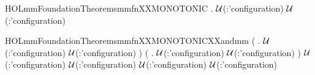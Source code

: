 \newcommand{\HOLmmFoundationTheoremsmmfnXXCLAUSES}{\UseVerbatim{HOLmmFoundationTheoremsmmfnXXCLAUSES}}
\begin{SaveVerbatim}{HOLmmFoundationTheoremsmmfnXXMONOTONIC}
\HOLTokenTurnstile{} \HOLSymConst{\HOLTokenForall{}}  .
        \HOLSymConst{\HOLTokenImp{}}
        \ensuremath{\cal{U}}(:'configuration)  \HOLConst{\HOLTokenSubset{}}
        \ensuremath{\cal{U}}(:'configuration) 
\end{SaveVerbatim}
\newcommand{\HOLmmFoundationTheoremsmmfnXXMONOTONIC}{\UseVerbatim{HOLmmFoundationTheoremsmmfnXXMONOTONIC}}
\begin{SaveVerbatim}{HOLmmFoundationTheoremsmmfnXXMONOTONICXXandmm}
\HOLTokenTurnstile{} (\HOLSymConst{\HOLTokenForall{}} .
         \HOLSymConst{\HOLTokenImp{}}
         \ensuremath{\cal{U}}(:'configuration)  \HOLConst{\HOLTokenSubset{}}
         \ensuremath{\cal{U}}(:'configuration) ) \HOLSymConst{\HOLTokenImp{}}
   (\HOLSymConst{\HOLTokenForall{}} .
         \HOLSymConst{\HOLTokenImp{}}
         \ensuremath{\cal{U}}(:'configuration)  \HOLConst{\HOLTokenSubset{}}
         \ensuremath{\cal{U}}(:'configuration) ) \HOLSymConst{\HOLTokenImp{}}
      \HOLSymConst{\HOLTokenImp{}}
      \ensuremath{\cal{U}}(:'configuration)  \HOLConst{\HOLTokenInter{}}
      \ensuremath{\cal{U}}(:'configuration)  \HOLConst{\HOLTokenSubset{}}
      \ensuremath{\cal{U}}(:'configuration)  \HOLConst{\HOLTokenInter{}}
      \ensuremath{\cal{U}}(:'configuration) 
\end{SaveVerbatim}
